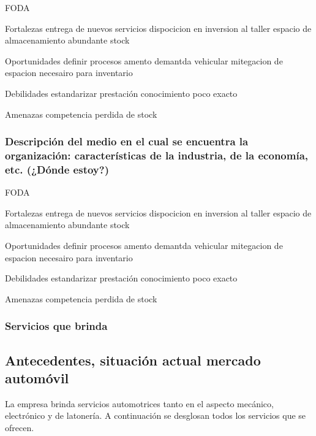 \documentclass[11pt]{article}
\begin{document}
    FODA

Fortalezas entrega de nuevos servicios dispocicion en inversion al
taller espacio de almacenamiento abundante stock

Oportunidades definir procesos amento demantda vehicular mitegacion de
espacion necesairo para inventario

Debilidades estandarizar prestación conocimiento poco exacto

Amenazas competencia perdida de stock

    \hypertarget{descripciuxf3n-del-medio-en-el-cual-se-encuentra-la-organizaciuxf3n-caracteruxedsticas-de-la-industria-de-la-economuxeda-etc.-duxf3nde-estoy}{%
\subsubsection{Descripción del medio en el cual se encuentra la
organización: características de la industria, de la economía, etc.
(¿Dónde
estoy?)}\label{descripciuxf3n-del-medio-en-el-cual-se-encuentra-la-organizaciuxf3n-caracteruxedsticas-de-la-industria-de-la-economuxeda-etc.-duxf3nde-estoy}}

FODA

Fortalezas entrega de nuevos servicios dispocicion en inversion al
taller espacio de almacenamiento abundante stock

Oportunidades definir procesos amento demantda vehicular mitegacion de
espacion necesairo para inventario

Debilidades estandarizar prestación conocimiento poco exacto

Amenazas competencia perdida de stock

\hypertarget{servicios-que-brinda}{%
\subsubsection{Servicios que brinda}\label{servicios-que-brinda}}

\hypertarget{antecedentes-situaciuxf3n-actual-mercado-automuxf3vil}{%
\subsection{Antecedentes, situación actual mercado
automóvil}\label{antecedentes-situaciuxf3n-actual-mercado-automuxf3vil}}

La empresa brinda servicios automotrices tanto en el aspecto mecánico,
electrónico y de latonería. A continuación se desglosan todos los
servicios que se ofrecen.
\end{document}
